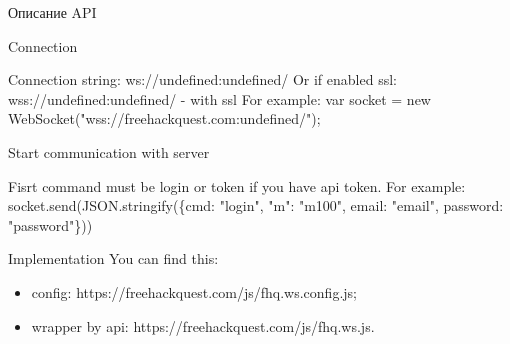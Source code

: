 \begin{center}
Описание API
\end{center}

Connection \par
\vspace{\baselineskip}
Connection string: ws://undefined:undefined/
Or if enabled ssl: wss://undefined:undefined/ - with ssl
\vspace{\baselineskip}
For example:
var socket = new WebSocket("wss://freehackquest.com:undefined/");
\vspace{\baselineskip}


Start communication with server \par
\vspace{\baselineskip}
Fisrt command must be login or token if you have api token.
\vspace{\baselineskip}
For example:
socket.send(JSON.stringify(\{cmd: "login", "m": "m100", email: "email", password: "password"\}))
\vspace{\baselineskip}

Implementation
\vspace{\baselineskip}
You can find this:
\begin{itemize}
\item config: https://freehackquest.com/js/fhq.ws.config.js;
\item wrapper by api: https://freehackquest.com/js/fhq.ws.js.
\end{itemize}
\vspace{\baselineskip}


\vspace{\baselineskip}
	

